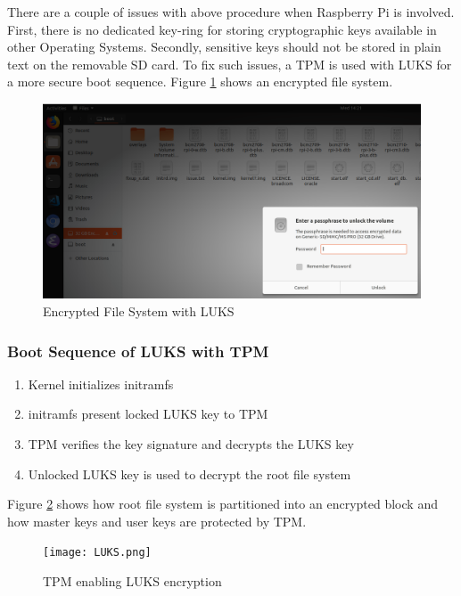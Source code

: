 \documentclass[11pt,openright]{report}
\begin{document}
There are a couple of issues with above procedure when Raspberry Pi is involved. First, there is no dedicated key-ring for storing cryptographic keys available in other Operating Systems. Secondly, sensitive keys should not be stored in plain text on the removable SD card. To fix such issues, a TPM is used with LUKS \cite{TPMLUKS} for a more secure boot sequence. Figure \ref{fig:encrypted_fs} shows an encrypted file system.

\begin{figure}
    \centering
    \includegraphics[scale=0.5]{images/2_LUKSEncryptedFormat.png}
    \caption{Encrypted File System with LUKS}
    \label{fig:encrypted_fs}
\end{figure}

\subsubsection{Boot Sequence of LUKS with TPM}
\renewcommand{\theenumi}{\roman{enumi}}%
\begin{enumerate}
	\item Kernel initializes initramfs
	\item initramfs present locked LUKS key to TPM
	\item TPM verifies the key signature and decrypts the LUKS key
	\item Unlocked LUKS key is used to decrypt the root file system
\end{enumerate}

Figure \ref{fig:tpmenableluks} shows how root file system is partitioned into an encrypted block and how master keys and user keys are protected by TPM.
\begin{figure}
	\centering
	\texttt{[image: LUKS.png]}
	\caption{TPM enabling LUKS encryption}
	\label{fig:tpmenableluks}
\end{figure}
\end{document}
